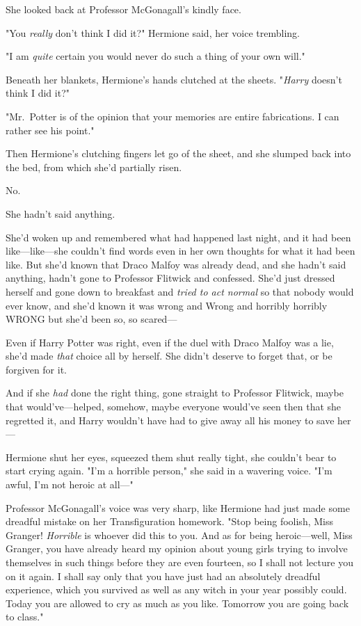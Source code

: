 She looked back at Professor McGonagall's kindly face.

"You \emph{really} don't think I did it?" Hermione said, her voice trembling.

"I am \emph{quite} certain you would never do such a thing of your own will."

Beneath her blankets, Hermione's hands clutched at the sheets. "\emph{Harry} 
doesn't think I did it?"

"Mr.~Potter is of the opinion that your memories are entire fabrications. I can 
rather see his point."

Then Hermione's clutching fingers let go of the sheet, and she slumped back 
into the bed, from which she'd partially risen.

No.

She hadn't said anything.

She'd woken up and remembered what had happened last night, and it had been 
like---like---she couldn't find words even in her own thoughts for what it had 
been like. But she'd known that Draco Malfoy was already dead, and she hadn't 
said anything, hadn't gone to Professor Flitwick and confessed. She'd just 
dressed herself and gone down to breakfast and \emph{tried to act normal} so 
that nobody would ever know, and she'd known it was wrong and Wrong and 
horribly horribly WRONG but she'd been so, so scared---

Even if Harry Potter was right, even if the duel with Draco Malfoy was a lie, 
she'd made \emph{that} choice all by herself. She didn't deserve to forget 
that, or be forgiven for it.

And if she \emph{had} done the right thing, gone straight to Professor 
Flitwick, maybe that would've---helped, somehow, maybe everyone would've seen 
then that she regretted it, and Harry wouldn't have had to give away all his 
money to save her---

Hermione shut her eyes, squeezed them shut really tight, she couldn't bear to 
start crying again. "I'm a horrible person," she said in a wavering voice. "I'm 
awful, I'm not heroic at all---"

Professor McGonagall's voice was very sharp, like Hermione had just made some 
dreadful mistake on her Transfiguration homework. "Stop being foolish, Miss 
Granger! \emph{Horrible} is whoever did this to you. And as for being 
heroic---well, Miss Granger, you have already heard my opinion about young 
girls trying to involve themselves in such things before they are even 
fourteen, so I shall not lecture you on it again. I shall say only that you 
have just had an absolutely dreadful experience, which you survived as well as 
any witch in your year possibly could. Today you are allowed to cry as much as 
you like. Tomorrow you are going back to class."

